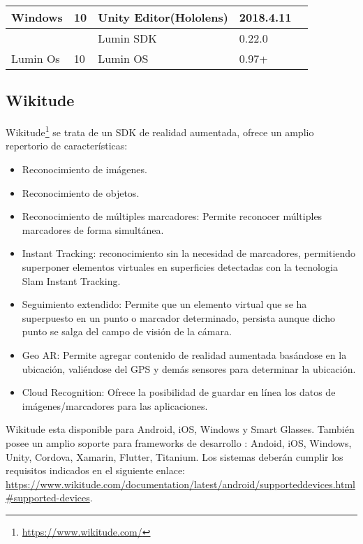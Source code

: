 \begin{table}[]
\begin{tabular}{|l|l|l|l|l|l|}
		\multirow{-3}{*}{Windows}  & \multirow{-3}{*}{10}     & \cellcolor[HTML]{EFEFEF}Unity Editor(Hololens) & \cellcolor[HTML]{EFEFEF}2018.4.11          & \multicolumn{2}{l|}{\multirow{-3}{*}{}}             \\ \hline
		&                          & Lumin SDK                                      & 0.22.0                                     & \multicolumn{2}{l|}{}                               \\ \cline{3-4}
		\multirow{-2}{*}{Lumin Os} & \multirow{-2}{*}{10}     & \cellcolor[HTML]{EFEFEF}Lumin OS               & \cellcolor[HTML]{EFEFEF}0.97+              & \multicolumn{2}{l|}{\multirow{-2}{*}{}}             \\ \hline
	\end{tabular}
\end{table}


\subsection{Wikitude}

Wikitude\footnote{\url{https://www.wikitude.com/}} se trata de un SDK de realidad aumentada, ofrece un amplio repertorio de características\cite{wikitude}: 

\begin{itemize}
	\item Reconocimiento de imágenes.
	\item Reconocimiento de objetos.
	\item Reconocimiento de múltiples marcadores: Permite reconocer múltiples marcadores de forma simultánea.
	\item Instant Tracking: reconocimiento sin la necesidad de marcadores, permitiendo superponer elementos virtuales en superficies detectadas con la tecnologia Slam Instant Tracking.	
	\item Seguimiento extendido: Permite que un elemento virtual que se ha superpuesto en un punto o marcador determinado, persista aunque dicho punto se salga del campo de visión de la cámara.	
	\item Geo AR: Permite agregar contenido de realidad aumentada basándose en la ubicación, valiéndose del GPS y demás sensores para determinar la ubicación.
	\item Cloud Recognition: Ofrece la posibilidad de guardar en línea los datos de imágenes/marcadores para las aplicaciones.	
\end{itemize}

Wikitude esta disponible para Android, iOS, Windows y Smart Glasses.
También posee un amplio soporte para frameworks de desarrollo : Andoid, iOS, Windows, Unity, Cordova, Xamarin, Flutter, Titanium. 
Los sistemas deberán cumplir los requisitos indicados en el siguiente enlace: \url{https://www.wikitude.com/documentation/latest/android/supporteddevices.html#supported-devices}.



